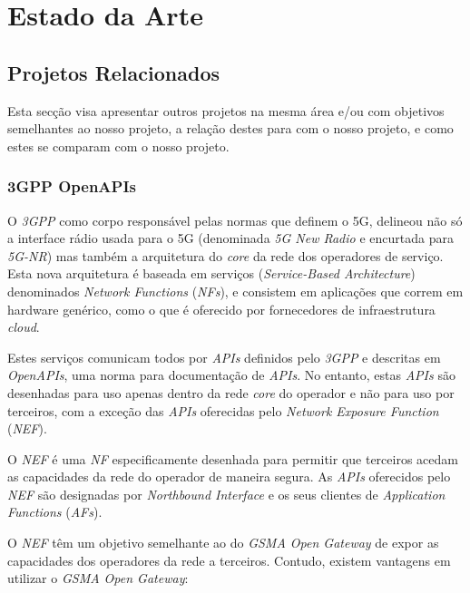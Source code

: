 \chapter{Estado da Arte}

\section{Projetos Relacionados}

Esta secção visa apresentar outros projetos na mesma área e/ou com objetivos
semelhantes ao nosso projeto, a relação destes para com o nosso projeto, e como
estes se comparam com o nosso projeto.

\subsection{3GPP OpenAPIs}\label{sec:related_work_3gpp}

O \emph{3GPP} como corpo responsável pelas normas que definem o 5G, delineou
não só a interface rádio usada para o 5G (denominada \emph{5G New Radio} e
encurtada para \emph{5G-NR}) mas também a arquitetura do \emph{core} da rede
dos operadores de serviço. Esta nova arquitetura é baseada em serviços
(\emph{Service-Based Architecture}) denominados \emph{Network Functions}
(\emph{NFs}), e consistem em aplicações que correm em hardware genérico, como o
que é oferecido por fornecedores de infraestrutura \emph{cloud}.

Estes serviços comunicam todos por \emph{APIs} definidos pelo \emph{3GPP} e
descritas em \emph{OpenAPIs}, uma norma para documentação de \emph{APIs}. No
entanto, estas \emph{APIs} são desenhadas para uso apenas dentro da rede
\emph{core} do operador e não para uso por terceiros, com a exceção das
\emph{APIs} oferecidas pelo \emph{Network Exposure Function} (\emph{NEF}).

O \emph{NEF} é uma \emph{NF} especificamente desenhada para permitir que
terceiros acedam as capacidades da rede do operador de maneira segura. As
\emph{APIs} oferecidos pelo \emph{NEF} são designadas por \emph{Northbound
	Interface} e os seus clientes de \emph{Application Functions} (\emph{AFs}).

O \emph{NEF} têm um objetivo semelhante ao do \emph{GSMA Open Gateway} de expor
as capacidades dos operadores da rede a terceiros. Contudo, existem vantagens
em utilizar o \emph{GSMA Open Gateway}:

